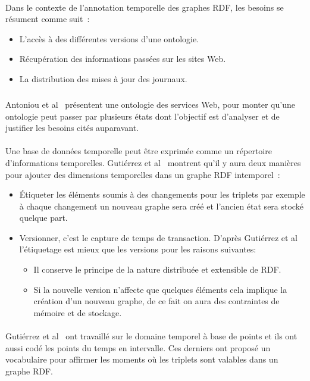 \paragraph{}
Dans le contexte de l'annotation temporelle des graphes RDF, les besoins se résument comme suit~:
\begin{itemize}
\item L'accès à des différentes versions d’une ontologie.
\item Récupération des informations passées sur les sites Web.
\item La distribution des mises à jour des journaux.
\end{itemize}
\subparagraph{}
Antoniou et al~\cite{antoniou2004} présentent une ontologie des services Web, pour monter qu'une ontologie peut passer par plusieurs états dont l'objectif est d'analyser et de justifier les besoins cités auparavant.
\paragraph{}
Une base de données temporelle peut être exprimée comme un répertoire d'informations temporelles.
Gutiérrez et al~\cite{gutierrez2007} montrent qu'il y aura deux manières pour ajouter des dimensions temporelles dans un graphe RDF intemporel~:
\begin{itemize}
\item Étiqueter les éléments soumis à des changements pour les triplets par exemple à chaque changement un nouveau graphe sera créé et l’ancien état sera stocké quelque part.
\item Versionner, c'est le capture de temps de transaction. D'après Gutiérrez et al~\cite{gutierrez2007} l’étiquetage est mieux que les versions pour les raisons suivantes:
\begin{itemize}
\item Il conserve le principe de la nature distribuée et extensible de RDF.
\item Si la nouvelle version n’affecte que quelques éléments cela implique la création d’un nouveau graphe, de ce fait on aura des contraintes de mémoire et de stockage. 
\end{itemize}
\end{itemize}
\paragraph{}
Gutiérrez et al~\cite{gutierrez2007} ont travaillé sur le domaine temporel à base de points et ils ont aussi codé les points du temps en intervalle. Ces derniers ont proposé un vocabulaire pour affirmer les moments où les triplets sont valables dans un graphe RDF.

